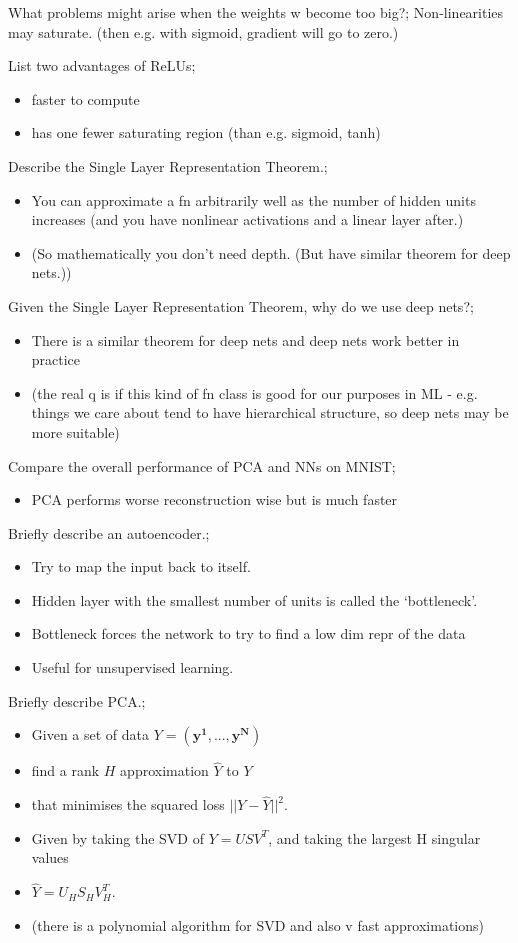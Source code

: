 \documentclass{article}
\begin{document}
What problems might arise when the weights w become too big?; Non-linearities may saturate. (then e.g. with sigmoid, gradient will go to zero.)

List two advantages of ReLUs; \begin{itemize} \item faster to compute \item has one fewer saturating region (than e.g. sigmoid, tanh) \end{itemize}

Describe the Single Layer Representation Theorem.; \begin{itemize} \item You can approximate a fn arbitrarily well as the number of hidden units increases (and you have nonlinear activations and a linear layer after.) \item (So mathematically you don't need depth. (But have similar theorem for deep nets.)) \end{itemize}

Given the Single Layer Representation Theorem, why do we use deep nets?; \begin{itemize} \item There is a similar theorem for deep nets and deep nets work better in practice \item (the real q is if this kind of fn class is good for our purposes in ML - e.g. things we care about tend to have hierarchical structure, so deep nets may be more suitable) \end{itemize}

Compare the overall performance of PCA and NNs on MNIST; \begin{itemize} \item PCA performs worse reconstruction wise but is much faster \end{itemize}

Briefly describe an autoencoder.; \begin{itemize} \item Try to map the input back to itself. \item Hidden layer with the smallest number of units is called the `bottleneck'. \item Bottleneck forces the network to try to find a low dim repr of the data \item Useful for unsupervised learning. \end{itemize}

Briefly describe PCA.; \begin{itemize} \item Given a set of data $Y = (\bm{y^1,...,y^N})$  \item find a rank $H$ approximation $\hat{Y}$ to $Y$  \item that minimises the squared loss $||Y - \hat{Y}||^2$. \item Given by taking the SVD of $Y=USV^T$, and taking the largest H singular values \item $\hat{Y} = U_HS_HV_H^T$. \item (there is a polynomial algorithm for SVD and also v fast approximations) \end{itemize}
\end{document}
